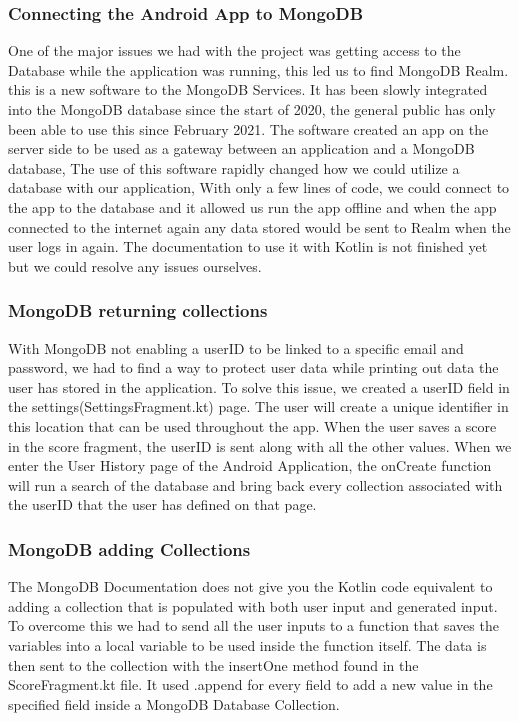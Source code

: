 \subsubsection{Connecting the Android App to MongoDB}
One of the major issues we had with the project was getting access to the Database while the application was running, this led us to find MongoDB Realm. this is a new software to the MongoDB Services. It has been slowly integrated into the MongoDB database since the start of 2020, the general public has only been able to use this since February 2021.
\newline
\newline 
The software created an app on the server side to be used as a gateway between an application and a MongoDB database, The use of this software rapidly changed how we could utilize a database with our application, With only a few lines of code, we could connect to the app to the database and it allowed us run the app offline and when the app connected to the internet again any data stored would be sent to Realm when the user logs in again. The documentation to use it with Kotlin is not finished yet but we could resolve any issues ourselves. \cite{ref10}
\newpage
\subsubsection{MongoDB returning collections}
With MongoDB not enabling a userID to be linked to a specific email and password, we had to find a way to protect user data while printing out data the user has stored in the application. To solve this issue, we created a userID field in the settings(SettingsFragment.kt) page. The user will create a unique identifier in this location that can be used throughout the app. When the user saves a score in the score fragment, the userID is sent along with all the other values. When we enter the User History page of the Android Application, the onCreate function will run a search of the database and bring back every collection associated with the userID that the user has defined on that page.

\subsubsection{MongoDB adding Collections}
The MongoDB Documentation does not give you the Kotlin code equivalent to adding a collection that is populated with both user input and generated input. To overcome this we had to send all the user inputs to a function that saves the variables into a local variable to be used inside the function itself. The data is then sent to the collection with the insertOne method found in the ScoreFragment.kt file. It used .append for every field to add a new value in the specified field inside a MongoDB Database Collection.
